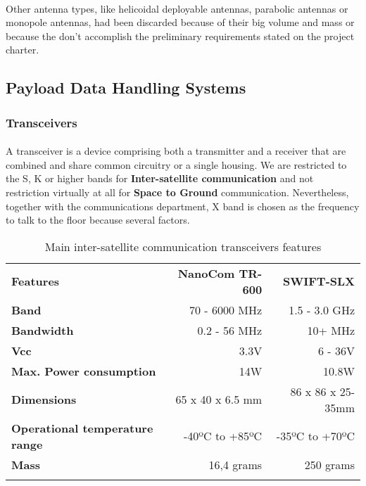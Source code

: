 \paragraph{}Other antenna types, like helicoidal deployable antennas, parabolic antennas or monopole antennas, had been discarded because of their big volume and mass or because the don't accomplish the preliminary requirements stated on the project charter.  

\subsection{Payload Data Handling Systems}
\subsubsection{Transceivers}

\paragraph{}A transceiver is a device comprising both a transmitter and a receiver that are combined and share common circuitry or a single housing. We are restricted to the S, K or higher bands for \textbf{Inter-satellite communication} and not restriction virtually at all for \textbf{Space to Ground} communication. Nevertheless, together with the communications department, X band is chosen as the frequency to talk to the floor because several factors.

\begin{longtable}{| l | r | r |}
	
	\hline
	\rowcolor[gray]{0.60} \multicolumn{3}{|c|}{\textbf{Transceivers options - Inter-satellite comm.(S band)}} \\
	\hline
	
	\hline
	\rowcolor[gray]{0.75}	\textbf{Features} &  \textbf{NanoCom TR-600} & \textbf{SWIFT-SLX} \\
	\hline
	
	\cellcolor[gray]{0.85} \textbf{Band} & 70 - 6000 MHz  & 1.5 - 3.0 GHz\\
	\cellcolor[gray]{0.85} \textbf{Bandwidth} & 0.2 - 56 MHz& 10+ MHz\\
	\cellcolor[gray]{0.85} \textbf{Vcc} & 3.3V&6 - 36V \\
	\cellcolor[gray]{0.85} \textbf{Max. Power consumption} & 14W& 10.8W\\
	\cellcolor[gray]{0.85} \textbf{Dimensions} & 65 x 40 x 6.5 mm & 86 x 86 x 25-35mm\\
	\cellcolor[gray]{0.85} \textbf{Operational temperature range} & -40ºC to +85ºC & -35ºC to +70ºC\\
	\cellcolor[gray]{0.85} \textbf{Mass} & 16,4 grams&250 grams \\
	\hline
	
	\caption{Main inter-satellite communication transceivers features}
	\label{TransceiversSband}
	
\end{longtable}

